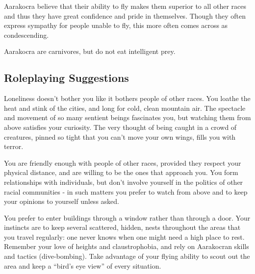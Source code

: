 Aarakocra believe that their ability to fly makes them superior to all other races and thus they have great confidence and pride in themselves. Though they often express sympathy for people unable to fly, this more often comes across as condescending.

Aarakocra are carnivores, but do not eat intelligent prey.
\subsection{Roleplaying Suggestions}
Loneliness doesn't bother you like it bothers people of other races. You loathe the heat and stink of the cities, and long for cold, clean mountain air. The spectacle and movement of so many sentient beings fascinates you, but watching them from above satisfies your curiosity. The very thought of being caught in a crowd of creatures, pinned so tight that you can't move your own wings, fills you with terror.

You are friendly enough with people of other races, provided they respect your physical distance, and are willing to be the ones that approach you. You form relationships with individuals, but don't involve yourself in the politics of other racial communities - in such matters you prefer to watch from above and to keep your opinions to yourself unless asked.

You prefer to enter buildings through a window rather than through a door. Your instincts are to keep several scattered, hidden, nests throughout the areas that you travel regularly: one never knows when one might need a high place to rest. Remember your love of heights and claustrophobia, and rely on Aarakocran skills and tactics (dive-bombing). Take advantage of your flying ability to scout out the area and keep a ``bird's eye view'' of every situation.

